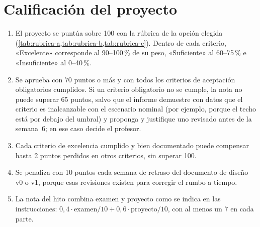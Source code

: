 \section{Calificación del proyecto}
\label{sec:proy-calificacion}

\begin{enumerate}[label=\arabic*.]
  \item El proyecto se puntúa sobre 100 con la rúbrica de la opción elegida (\cref{tab:rubrica-a,tab:rubrica-b,tab:rubrica-c}). Dentro de cada criterio, «Excelente» corresponde al 90--100\,\% de su peso, «Suficiente» al 60--75\,\% e «Insuficiente» al 0--40\,\%.
  \item Se aprueba con 70 puntos o más y con todos los criterios de aceptación obligatorios cumplidos. Si un criterio obligatorio no se cumple, la nota no puede superar 65 puntos, salvo que el informe demuestre con datos que el criterio es inalcanzable con el escenario nominal (por ejemplo, porque el techo está por debajo del umbral) y proponga y justifique uno revisado antes de la semana~6; en ese caso decide el profesor.
  \item Cada criterio de excelencia cumplido y bien documentado puede compensar hasta 2 puntos perdidos en otros criterios, sin superar 100.
  \item Se penaliza con 10 puntos cada semana de retraso del documento de diseño v0 o v1, porque esas revisiones existen para corregir el rumbo a tiempo.
  \item La nota del hito combina examen y proyecto como se indica en las instrucciones: $0{,}4\cdot\text{examen}/10+0{,}6\cdot\text{proyecto}/10$, con al menos un 7 en cada parte.
\end{enumerate}
